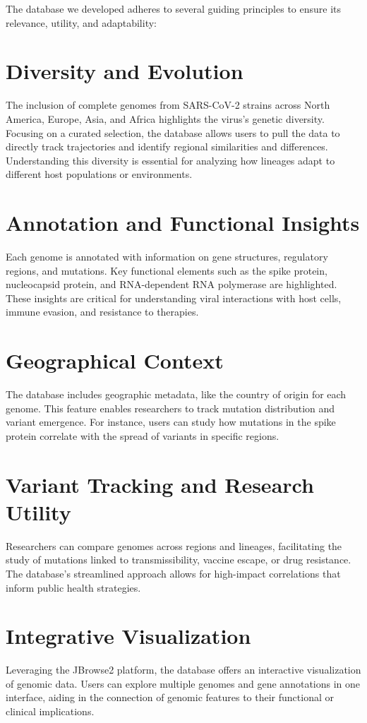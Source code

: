 \documentclass[11pt]{article}
\begin{document}
The database we developed adheres to several guiding principles to ensure its relevance, utility, and adaptability:

\section{Diversity and Evolution}
The inclusion of complete genomes from SARS-CoV-2 strains across North America, Europe, Asia, and Africa highlights
the virus's genetic diversity. Focusing on a curated selection, the database allows users to pull the data to directly track
trajectories and identify regional similarities and differences. Understanding this diversity is essential for analyzing how lineages adapt to different host populations or environments.

\section{Annotation and Functional Insights}
Each genome is annotated with information on gene structures, regulatory regions, and mutations. Key functional elements
such as the spike protein, nucleocapsid protein, and RNA-dependent RNA polymerase are highlighted. These insights are
critical for understanding viral interactions with host cells, immune evasion, and resistance to therapies.

\section{Geographical Context}
The database includes geographic metadata, like the country of origin for each genome. This feature enables researchers
to track mutation distribution and variant emergence. For instance, users can study how mutations in the spike protein
correlate with the spread of variants in specific regions.

\section{Variant Tracking and Research Utility}
Researchers can compare genomes across regions and lineages, facilitating the study of mutations linked to
transmissibility, vaccine escape, or drug resistance. The database’s streamlined approach allows for
high-impact correlations that inform public health strategies.

\section{Integrative Visualization}
Leveraging the JBrowse2 platform, the database offers an interactive visualization of genomic data.
Users can explore multiple genomes and gene annotations in one interface, aiding in the connection
of genomic features to their functional or clinical implications.
\end{document}
